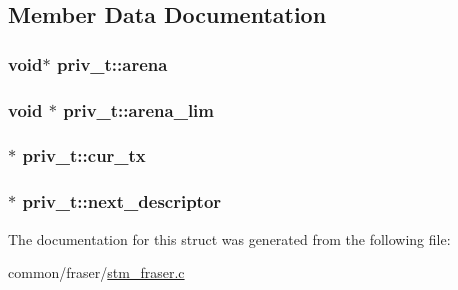 \subsection{Member Data Documentation}
\hypertarget{structpriv__t_a53ecd8984f65653b0408cddc1e41508b}{
\subsubsection[{arena}]{\setlength{\rightskip}{0pt plus 5cm}void$\ast$ priv\-\_\-t\-::arena}}\label{structpriv__t_a53ecd8984f65653b0408cddc1e41508b}
\hypertarget{structpriv__t_a065eac69ec03166748aff90a80cec9fa}{
\subsubsection[{arena\-\_\-lim}]{\setlength{\rightskip}{0pt plus 5cm}void $\ast$ priv\-\_\-t\-::arena\-\_\-lim}}\label{structpriv__t_a065eac69ec03166748aff90a80cec9fa}
\hypertarget{structpriv__t_a7caf2d602b754faeeacee8d0b67a345e}{
\subsubsection[{cur\-\_\-tx}]{$\ast$ priv\-\_\-t\-::cur\-\_\-tx}}\label{structpriv__t_a7caf2d602b754faeeacee8d0b67a345e}
\hypertarget{structpriv__t_ac09372e8aa4b52bcabd8bfb07e142ada}{
\subsubsection[{next\-\_\-descriptor}]{$\ast$ priv\-\_\-t\-::next\-\_\-descriptor}}\label{structpriv__t_ac09372e8aa4b52bcabd8bfb07e142ada}


The documentation for this struct was generated from the following file\-:\begin{DoxyCompactItemize}
\item 
common/fraser/\hyperlink{stm__fraser_8c}{stm\-\_\-fraser.\-c}\end{DoxyCompactItemize}
